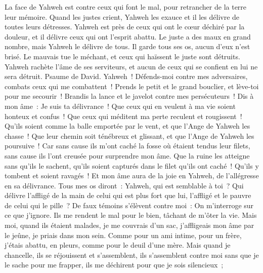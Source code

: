 \begin{multicols}{2}
 La face de Yahweh est contre ceux qui font le mal, pour retrancher de la terre leur mémoire.
 Quand les justes crient, Yahweh les exauce et il les délivre de toutes leurs détresses.
 Yahweh est près de ceux qui ont le cœur déchiré par la douleur, et il délivre ceux qui ont l'esprit abattu.
 Le juste a des maux en grand nombre, mais Yahweh le délivre de tous.
 Il garde tous ses os, aucun d'eux n'est brisé.
 Le mauvais tue le méchant, et ceux qui haïssent le juste sont détruits.
 Yahweh rachète l'âme de ses serviteurs, et aucun de ceux qui se confient en lui ne sera détruit.
\VerseOne{}Psaume de David. Yahweh~! Défends-moi contre mes adversaires, combats ceux qui me combattent~!
Prends le petit et le grand bouclier, et lève-toi pour me secourir~!
Brandis la lance et le javelot contre mes persécuteurs~! Dis à mon âme~: Je suis ta délivrance~!
Que ceux qui en veulent à ma vie soient honteux et confus~! Que ceux qui méditent ma perte reculent et rougissent~!
Qu'ils soient comme la balle emportée par le vent, et que l'Ange de Yahweh les chasse~!
Que leur chemin soit ténébreux et glissant, et que l'Ange de Yahweh les poursuive~!
Car sans cause ils m'ont caché la fosse où étaient tendus leur filets, sans cause ils l'ont creusée pour  surprendre mon âme.
Que la ruine les atteigne sans qu'ils le sachent, qu'ils soient capturés dans le filet qu'ils ont caché~! Qu'ils y tombent et soient ravagés~!
Et mon âme aura de la joie en Yahweh, de l'allégresse en sa délivrance.
Tous mes os diront~: Yahweh, qui est semblable à toi~? Qui délivre l'affligé de la main de celui qui est plus fort que lui, l'affligé et le pauvre de celui qui le pille~?
De faux témoins s'élèvent contre moi~: On m'interroge sur ce que j'ignore.
Ils me rendent le mal pour le bien, tâchant de m'ôter la vie.
Mais moi, quand ils étaient malades, je me couvrais d'un sac, j'affligeais mon âme par le jeûne, je priais dans mon sein.
Comme pour un ami intime, pour un frère, j'étais abattu, en pleurs, comme pour le deuil d'une mère.
Mais quand je chancelle, ils se réjouissent et s'assemblent, ils s'assemblent contre moi sans que je le sache pour me frapper, ils me déchirent pour que je sois silencieux~;

\end{multicols}

